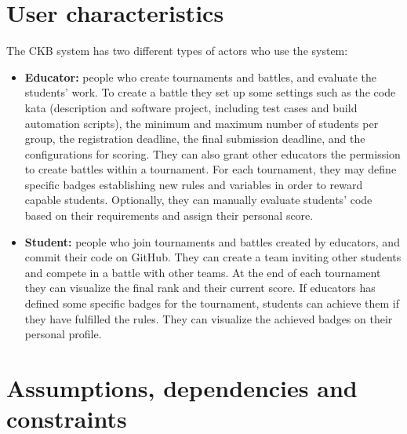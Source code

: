 \section{User characteristics}
The CKB system has two different types of actors who use the system:
\begin{itemize}
    \item \textbf{Educator:} people who create tournaments and battles, and evaluate the students' work. 
    To create a battle they set up some settings such as the code kata (description and software project, including test cases and build
    automation scripts), the minimum and maximum number of students per group, the registration deadline, the final submission deadline, and the configurations for scoring.
    They can also grant other educators the permission to create battles within a tournament. 
    For each tournament, they may define specific badges establishing new rules and variables in order to reward capable students.
    Optionally, they can manually evaluate students' code based on their requirements and assign their personal score. 
    \item \textbf{Student:} people who join tournaments and battles created by educators, and commit their code on GitHub. 
    They can create a team inviting other students and compete in a battle with other teams. 
    At the end of each tournament they can visualize the final rank and their current score. 
    If educators has defined some specific badges for the tournament, students can achieve them if they have fulfilled the rules. 
    They can visualize the achieved badges on their personal profile. 
\end{itemize}

\section{Assumptions, dependencies and constraints}

